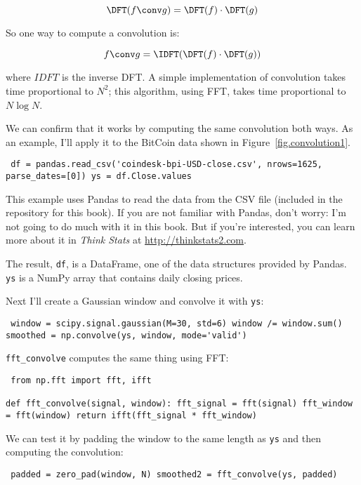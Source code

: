 \documentclass[12pt]{book} \usepackage[width=5.5in,height=8.5in, hmarginratio=3:2,vmarginratio=1:1]{geometry}
\begin{document}
%
\[ \DFT(f \conv g) = \DFT(f) \cdot \DFT(g) \] 

%
So one way to compute a convolution is: 

%
\[ f \conv g = \IDFT(\DFT(f) \cdot \DFT(g)) \] 

%
where $IDFT$ is the inverse DFT. A simple implementation of convolution takes time proportional to $N^2$; this algorithm, using FFT, takes time proportional to $N \log N$. 

We can confirm that it works by computing the same convolution both ways. As an example, I'll apply it to the BitCoin data shown in Figure~\ref{fig.convolution1}. 

\begin{verbatim} df = pandas.read_csv('coindesk-bpi-USD-close.csv', nrows=1625, parse_dates=[0]) ys = df.Close.values \end{verbatim} 

This example uses Pandas to read the data from the CSV file (included in the repository for this book). If you are not familiar with Pandas, don't worry: I'm not going to do much with it in this book. But if you're interested, you can learn more about it in {\it Think Stats} at \url{http://thinkstats2.com}. 

The result, {\tt df}, is a DataFrame, one of the data structures provided by Pandas. {\tt ys} is a NumPy array that contains daily closing prices. 

Next I'll create a Gaussian window and convolve it with {\tt ys}: 

\begin{verbatim} window = scipy.signal.gaussian(M=30, std=6) window /= window.sum() smoothed = np.convolve(ys, window, mode='valid') \end{verbatim} 

\verb"fft_convolve" computes the same thing using FFT: 

\begin{verbatim} from np.fft import fft, ifft 

def fft_convolve(signal, window): fft_signal = fft(signal) fft_window = fft(window) return ifft(fft_signal * fft_window) \end{verbatim} 

We can test it by padding the window to the same length as {\tt ys} and then computing the convolution: 

\begin{verbatim} padded = zero_pad(window, N) smoothed2 = fft_convolve(ys, padded) \end{verbatim} 
\end{document}

